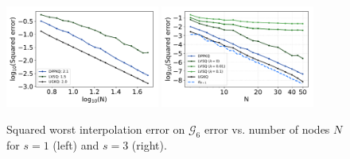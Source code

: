 \documentclass[twoside,11pt]{book}
\numberwithin{theorem}{chapter}
\numberwithin{definition}{chapter}
\numberwithin{proposition}{chapter}
\numberwithin{corollary}{chapter}
\numberwithin{example}{chapter}
\numberwithin{lemma}{chapter}
\numberwithin{assumption}{chapter}
\DeclareMathOperator{\X}{\mathcal{X}}
\begin{document}
\begin{figure}
\centering
\includegraphics[width=0.45\textwidth]{img/neurips/Sobolev/suponunitball_interpolation_pSobolev_s_1_binarycubeM_64_fig_1.pdf}
\includegraphics[width=0.45\textwidth]{img/neurips/Sobolev/suponunitball_interpolation_pSobolev_s_3_randomvectors_2000_fig_1.pdf}\\
\caption{Squared worst interpolation error on $\mathcal{G}_{6}$ error vs. number of nodes $N$ for $s = 1$ (left) and $s=3$ (right).
\label{fig:pDPP_results_pSobolev_exp_3_G6}}
\end{figure}
\end{document}
